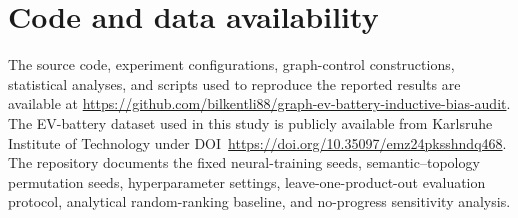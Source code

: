 \section*{Code and data availability}

The source code, experiment configurations, graph-control constructions, statistical analyses, and scripts used to reproduce the reported results are available at \url{https://github.com/bilkentli88/graph-ev-battery-inductive-bias-audit}. The EV-battery dataset used in this study is publicly available from Karlsruhe Institute of Technology under DOI~\url{https://doi.org/10.35097/emz24pksshndq468}. The repository documents the fixed neural-training seeds, semantic--topology permutation seeds, hyperparameter settings, leave-one-product-out evaluation protocol, analytical random-ranking baseline, and no-progress sensitivity analysis.
